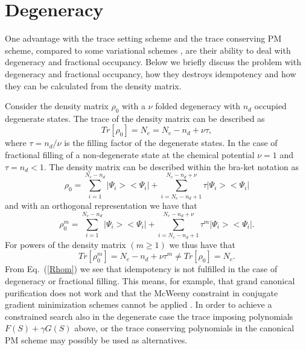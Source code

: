 \section{Degeneracy}

One advantage with the trace setting scheme and the trace
conserving PM scheme, compared to some variational schemes \cite{Li93},
are their ability to deal with degeneracy and fractional occupancy.
Below we briefly discuss the problem with degeneracy and fractional
occupancy, how they destroys idempotency and how they can be calculated
from the density matrix.

Consider the density matrix $\rho_0$  with a $\nu$ folded degeneracy
with $n_d$ occupied degenerate states. The trace of the density matrix
can be described as
\begin{equation}
Tr [ \rho_0  ] = N_e = N_e-n_d + \nu \tau,
\end{equation}
where $\tau = n_d/\nu$ is the filling factor of the degenerate states.
In the case of fractional filling of a non-degenerate state at the
chemical potential $\nu = 1$ and $\tau = n_d < 1$.
The density matrix can be described within the bra-ket notation as
\begin{equation}
\rho_0 = \sum_{ i=1 }^{ N_e - n_d } |\Psi_i >< \Psi_i | + 
\sum_{ i= N_e - n_d + 1 }^{ N_e - n_d + \nu } \tau | \Psi_i> < \Psi_i |
\end{equation}
and with an orthogonal representation we have that
\begin{equation}
\rho_0^m = \sum_{i=1}^{N_e-n_d} |\Psi_i><\Psi_i| + 
\sum_{i=N_e-n_d + 1}^{N_e - n_d +\nu} \tau^m |\Psi_i><\Psi_i|.
\end{equation}
For powers of the density matrix $(m \geq 1)$ we thus have that
\begin{equation} \label{Rhom}
Tr [ \rho_0^m  ] = N_e - n_d + \nu \tau^m \neq Tr  [ \rho_0  ] = N_e.
\end{equation}
From Eq.\ (\ref{Rhom}) we see that idempotency is not
fulfilled in the case of degeneracy or fractional filling. 
This means, for example, that grand canonical purification does not work and
that the McWeeny constraint in conjugate gradient
minimization schemes cannot be applied \cite{Li93}.
In order to achieve a constrained search also
in the degenerate case the trace imposing polynomials
$F(S) + \gamma G(S)$ above, or the trace conserving polynomials
in the canonical PM scheme may possibly be used as alternatives.

